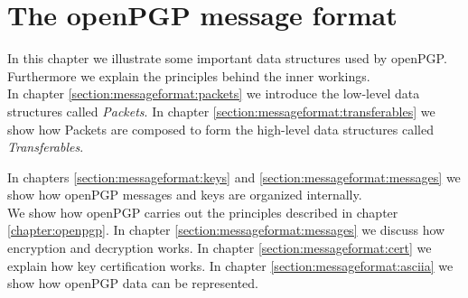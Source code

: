 \chapter{The openPGP message format} \label{chapter:messageformat}









In this chapter we illustrate some important data structures used by openPGP. Furthermore we explain the principles behind the inner workings. \\

In chapter \ref{section:messageformat:packets} we introduce the low-level data structures called \textit{Packets}. In chapter \ref{section:messageformat:transferables} we show how Packets are composed to form the high-level data structures called \textit{Transferables}.

In chapters \ref{section:messageformat:keys} and \ref{section:messageformat:messages} we show how openPGP messages and keys are organized internally. \\

We show how openPGP carries out the principles described in chapter \ref{chapter:openpgp}.
In chapter \ref{section:messageformat:messages} we discuss how encryption and decryption works. In chapter \ref{section:messageformat:cert} we explain how key certification works. In chapter \ref{section:messageformat:asciia} we show how openPGP data can be represented.


